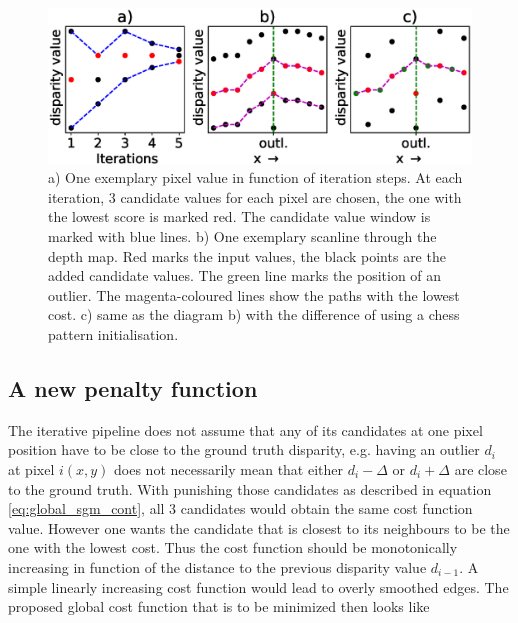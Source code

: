 \documentclass  [
  paper    = a4,
  BCOR     = 10mm,
  twoside,
  fontsize = 12pt,
  fleqn,
  toc      = bibnumbered,
  toc      = listofnumbered,
  numbers  = noendperiod,
  headings = normal,
  listof   = leveldown,
  version  = 3.03
]                                       {scrreprt}
\begin{document}
\begin{figure}
	\centering
	\includegraphics[width=1\linewidth]{images/iteration_steps}
	\caption[Iteration steps]{a) One exemplary pixel value in function of iteration steps. At each iteration, 3 candidate values for each pixel are chosen, the one with the lowest score is marked red. The candidate value window is marked with blue lines. b) One exemplary scanline through the depth map. Red marks the input values, the black points are the added candidate values. The green line marks the position of an outlier. The magenta-coloured lines show the paths with the lowest cost. c) same as the diagram b) with the difference of using a chess pattern initialisation. }
	\label{fig:iterationsteps}
\end{figure}

\subsection{A new penalty function} 
The iterative pipeline does not assume that any of its candidates at one pixel position have to be close to the ground truth disparity, e.g. having an outlier $d_i$ at pixel $i(x,y)$ does not necessarily mean that either $d_i-\Delta$ or $d_i+\Delta$ are close to the ground truth. With punishing those candidates as described in equation \ref{eq:global_sgm_cont}, all 3 candidates would obtain the same cost function value. However one wants the candidate that is closest to its neighbours to be the one with the lowest cost. Thus the cost function should be monotonically increasing in function of the distance to the previous disparity value $d_{i-1}$. A simple linearly increasing cost function would lead to overly smoothed edges. The proposed global cost function that is to be minimized then looks like
\end{document}
